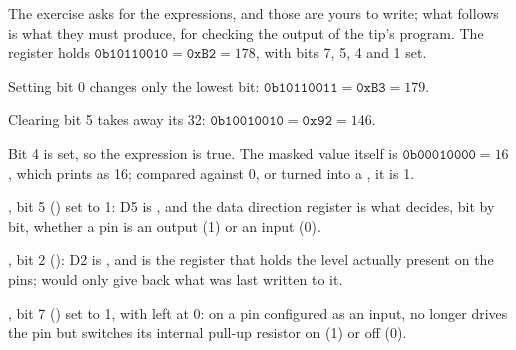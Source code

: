 The exercise asks for the expressions, and those are yours to write; what follows is what they
must produce, for checking the output of the tip's program. The register holds
$\mathtt{0b10110010} = \mathtt{0xB2} = 178$, with bits 7, 5, 4 and 1 set.
\begin{parts}
  \item Setting bit 0 changes only the lowest bit: $\mathtt{0b10110011} = \mathtt{0xB3} = 179$.
  \item Clearing bit 5 takes away its 32: $\mathtt{0b10010010} = \mathtt{0x92} = 146$.
  \item Bit 4 is set, so the expression is true. The masked value itself is
    $\mathtt{0b00010000} = 16$, which  prints as 16; compared against 0,
    or turned into a , it is 1.
\end{parts}

\begin{parts}
  \item {}, bit 5 () set to 1: D5 is , and the data direction
    register is what decides, bit by bit, whether a pin is an output (1) or an input (0).
  \item {}, bit 2 (): D2 is , and  is the register
    that holds the level actually present on the pins;  would only give back what was
    last written to it.
  \item {}, bit 7 () set to 1, with  left at 0: on a pin
    configured as an input,  no longer drives the pin but switches its internal pull-up
    resistor on (1) or off (0).
\end{parts}
